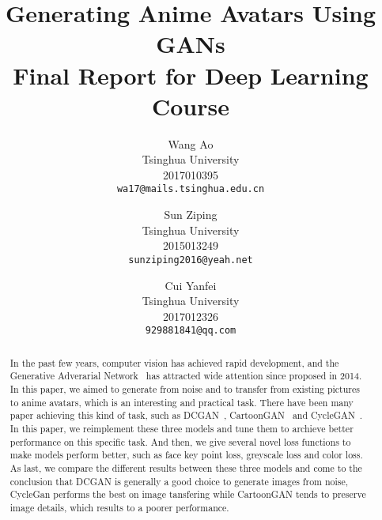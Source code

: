 \documentclass[10pt,twocolumn,letterpaper]{article}
\begin{document}
\title{Generating Anime Avatars Using GANs \\ \large Final Report for Deep Learning Course}

\author{Wang Ao\\
Tsinghua University\\
2017010395\\
{\tt\small wa17@mails.tsinghua.edu.cn}
\and
Sun Ziping\\
Tsinghua University\\
2015013249\\
{\tt\small sunziping2016@yeah.net}
\and
Cui Yanfei\\
Tsinghua University\\
2017012326\\
{\tt\small 929881841@qq.com}
}

\maketitle

\begin{abstract}

In the past few years, computer vision has achieved rapid development, and the
Generative Adverarial Network~\cite{GAN} has attracted wide attention since
proposed in 2014. In this paper, we aimed to generate from noise and to transfer
from existing pictures to anime avatars, which is an interesting and practical
task. There have been many paper achieving this kind of task, such as
DCGAN~\cite{DCGAN}, CartoonGAN~\cite{CartoonGAN} and
CycleGAN~\cite{CycleGAN2017}. In this paper, we reimplement these three models
and tune them to archieve better performance on this specific task. And then, we
give several novel loss functions to make models perform better, such as face
key point loss, greyscale loss and color loss. As last, we compare the different
results between these three models and come to the conclusion that DCGAN is
generally a good choice to generate images from noise, CycleGan performs the
best on image tansfering while CartoonGAN tends to preserve image details, which
results to a poorer performance.

\end{abstract}
\end{document}
